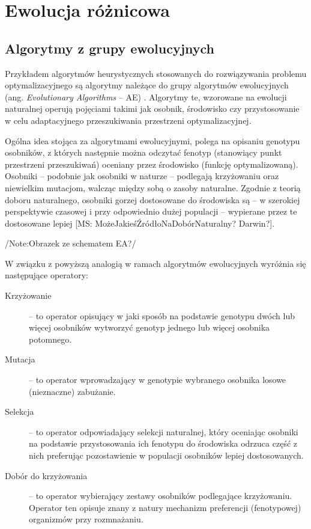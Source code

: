 \documentclass[12pt,a4paper]{report}
\begin{document}
{{%
\section{Ewolucja różnicowa}
\label{DEvolChapter}

\subsection{Algorytmy z grupy ewolucyjnych}
\par{
Przykładem algorytmów heurystycznych stosowanych do rozwiązywania problemu optymalizacyjnego są algorytmy należące do grupy algorytmów ewolucyjnych (ang. \emph{Evolutionary Algorithms} -- AE) \cite{WykladyEvol,SpringerIntroToEvol}. Algorytmy te, wzorowane na ewolucji naturalnej operują pojęciami takimi jak osobnik, środowisko czy przystosowanie w celu adaptacyjnego przeszukiwania przestrzeni optymalizacyjnej.
}
\par{
Ogólna idea stojąca za algorytmami ewolucyjnymi, polega na opisaniu genotypu osobników, z których następnie można odczytać fenotyp (stanowiący punkt przestrzeni przeszukiwań) oceniany przez środowisko (funkcję optymalizowaną). Osobniki -- podobnie jak osobniki w naturze -- podlegają krzyżowaniu oraz niewielkim mutacjom, walcząc między sobą o zasoby naturalne. Zgodnie z teorią doboru naturalnego, osobniki gorzej dostosowane do środowiska są -- w szerokiej perspektywie czasowej i przy odpowiednio dużej populacji -- wypierane przez te dostosowane lepiej [MS: MożeJakieśŹródłoNaDobórNaturalny? Darwin?].
}
\par{
/Note:Obrazek ze schematem EA?/
}
\par{
W związku z powyższą analogią w ramach algorytmów ewolucyjnych wyróżnia się następujące operatory:
\begin{description}
  \item[Krzyżowanie] -- to operator opisujący w jaki sposób na podstawie genotypu dwóch lub więcej osobników wytworzyć genotyp jednego lub więcej osobnika potomnego.
  \item[Mutacja] -- to operator wprowadzający w genotypie wybranego osobnika losowe (nieznaczne) zabużanie.
  \item[Selekcja] -- to operator odpowiadający selekcji naturalnej, który oceniając osobniki na podstawie przystosowania ich fenotypu do środowiska odrzuca część z nich preferując pozostawienie w populacji osobników lepiej dostosowanych.
  \item[Dobór do krzyżowania] -- to operator wybierający zestawy osobników podlegające krzyżowaniu. Operator ten opisuje znany z natury mechanizm preferencji (fenotypowej) organizmów przy rozmnażaniu.

\end{description}}}}
\end{document}
